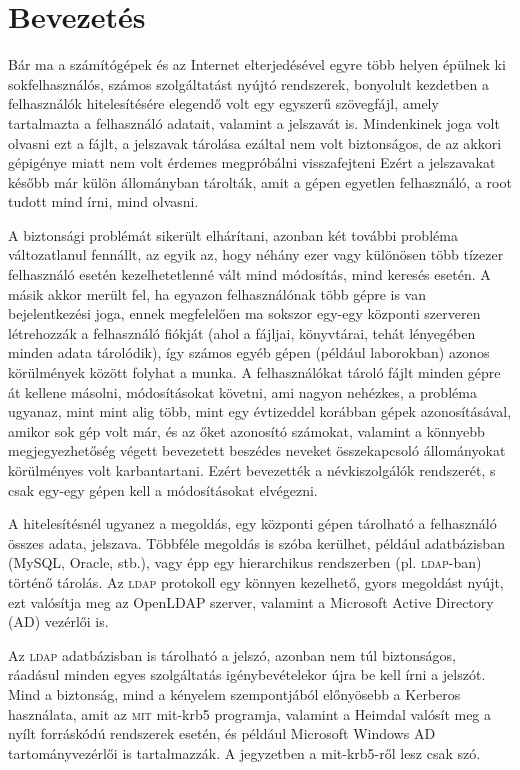 \chapter{Bevezetés}

Bár ma a számítógépek és az Internet elterjedésével egyre több helyen épülnek ki sokfelhasználós, számos szolgáltatást
nyújtó rendszerek, bonyolult kezdetben a felhasználók hitelesítésére elegendő volt egy egyszerű szövegfájl, amely
tartalmazta a felhasználó adatait, valamint a jelszavát is. Mindenkinek joga volt olvasni ezt a fájlt, a jelszavak
tárolása ezáltal nem volt biztonságos, de az akkori gépigénye miatt nem volt érdemes megpróbálni visszafejteni Ezért a
jelszavakat később már külön állományban tárolták, amit a gépen egyetlen felhasználó, a root tudott mind írni, mind
olvasni.

A biztonsági problémát sikerült elhárítani, azonban két további probléma változatlanul fennállt, az egyik az, hogy
néhány ezer vagy különösen több tízezer felhasználó esetén kezelhetetlenné vált mind módosítás, mind keresés esetén. A
másik akkor merült fel, ha egyazon felhasználónak több gépre is van bejelentkezési joga, ennek megfelelően ma sokszor
egy-egy központi szerveren létrehozzák a felhasználó fiókját (ahol a fájljai, könyvtárai, tehát lényegében minden adata
tárolódik), így számos egyéb gépen (például laborokban) azonos körülmények között folyhat a munka. A felhasználókat
tároló fájlt minden gépre át kellene másolni, módosításokat követni, ami nagyon nehézkes, a probléma ugyanaz, mint  mint
alig több, mint egy évtizeddel korábban gépek azonosításával, amikor sok gép volt már, és az őket azonosító számokat,
valamint a könnyebb megjegyezhetőség végett bevezetett beszédes neveket összekapcsoló állományokat körülményes volt
karbantartani. Ezért bevezették a névkiszolgálók rendszerét, s csak egy-egy gépen kell a módosításokat elvégezni.

A hitelesítésnél ugyanez a megoldás, egy központi gépen tárolható a felhasználó összes adata, jelszava. Többféle
megoldás is szóba kerülhet, például adatbázisban (MySQL, Oracle, stb.), vagy épp egy hierarchikus rendszerben
(pl. \textsc{ldap}-ban) történő tárolás. Az \textsc{ldap} protokoll egy könnyen kezelhető, gyors megoldást nyújt, ezt
valósítja meg az OpenLDAP szerver, valamint a Microsoft Active Directory (\textsc{AD}) vezérlői is. 

Az \textsc{ldap} adatbázisban is tárolható a jelszó, azonban nem túl biztonságos, ráadásul minden egyes szolgáltatás
igénybevételekor újra be kell írni a jelszót. Mind a biztonság, mind a kényelem szempontjából előnyösebb a Kerberos
használata, amit az \textsc{mit} mit-krb5 programja, valamint a Heimdal valósít meg a nyílt forráskódú rendszerek
esetén, és például Microsoft Windows AD tartományvezérlői is tartalmazzák. A jegyzetben a mit-krb5-ről lesz csak szó.


